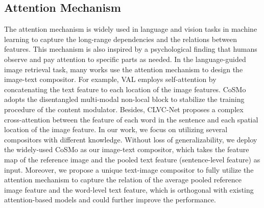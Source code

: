 \documentclass[sigconf]{acmart}
\begin{document}
\subsection{Attention Mechanism}
The attention mechanism is widely used in language and vision tasks in machine learning to capture the long-range dependencies and the relations between features. This mechanism is also inspired by a psychological finding \cite{corbetta2002control} that humans observe and pay attention to specific parts as needed. In the language-guided image retrieval task, many works use the attention mechanism to design the image-text compositor. For example, VAL \cite{chen2020image} employs self-attention by concatenating the text feature to each location of the image features. CoSMo \cite{lee2021cosmo} adopts the disentangled multi-modal non-local block to stabilize the training procedure of the content modulator. Besides, CLVC-Net \cite{wen2021comprehensive} proposes a complex cross-attention between the feature of each word in the sentence and each spatial location of the image feature. 
In our work, we focus on utilizing several compositors with different knowledge. Without loss of generalizability, we deploy the widely-used CoSMo \cite{lee2021cosmo} as our image-text compositor, which takes the feature map of the reference image and the pooled text feature (sentence-level feature) as input. Moreover, we propose a unique text-image compositor to fully utilize the attention mechanism to capture the relation of the average pooled reference image feature and the word-level text feature, which is orthogonal with existing attention-based models and could further improve the performance.
\end{document}
